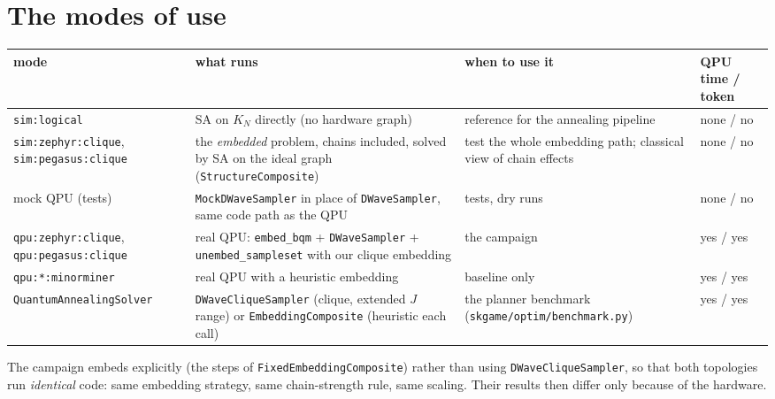 \documentclass[11pt,a4paper]{article}
\newcommand{\code}[1]{\nolinkurl{#1}}
\newcommand{\src}[4]{}
\begin{document}
\section{The modes of use}\label{sec:modes}
\begin{longtable}{L{3.0cm}L{4.7cm}L{4.0cm}L{3.3cm}}
\toprule
mode & what runs & when to use it & QPU time / token \\ \midrule\endhead
\code{sim:logical} & SA on $K_N$ directly (no hardware graph) & reference for the annealing pipeline & none / no \\
\code{sim:zephyr:clique}, \code{sim:pegasus:clique} & the \emph{embedded} problem, chains included, solved by SA on the ideal graph (\code{StructureComposite}) & test the whole embedding path; classical view of chain effects & none / no \\
mock QPU (tests) & \code{MockDWaveSampler} in place of \code{DWaveSampler}, same code path as the QPU & tests, dry runs & none / no \\
\code{qpu:zephyr:clique}, \code{qpu:pegasus:clique} & real QPU: \code{embed_bqm} + \code{DWaveSampler} + \code{unembed_sampleset} with our clique embedding & the campaign & yes / yes \\
\code{qpu:*:minorminer} & real QPU with a heuristic embedding & baseline only & yes / yes \\
\code{QuantumAnnealingSolver} & \code{DWaveCliqueSampler} (clique, extended $J$ range) or \code{EmbeddingComposite} (heuristic each call) & the planner benchmark (\code{skgame/optim/benchmark.py}) & yes / yes \\
\bottomrule
\end{longtable}
\src{skgame/optim/quantum.py}{\rMakesamplerA}{\rMakesamplerB}{the single-solver path: \code{DWaveCliqueSampler} or \code{EmbeddingComposite}}

The campaign embeds explicitly (the steps of \code{FixedEmbeddingComposite}) rather than using \code{DWaveCliqueSampler}, so that both topologies run
\emph{identical} code: same embedding strategy, same chain-strength rule, same scaling. Their results then differ only because of the hardware.

\end{document}

